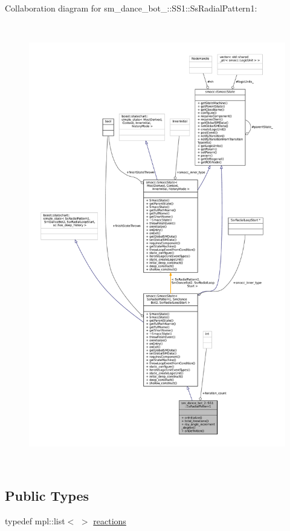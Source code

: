 Collaboration diagram for sm\+\_\+dance\+\_\+bot\+\_\+:\+:S\+S1\+:\+:Ss\+Radial\+Pattern1\+:
\nopagebreak
\begin{figure}[H]
\begin{center}
\leavevmode
\includegraphics[height=550pt]{structsm__dance__bot__2_1_1SS1_1_1SsRadialPattern1__coll__graph}
\end{center}
\end{figure}
\subsection*{Public Types}
\begin{DoxyCompactItemize}
\item 
typedef mpl\+::list$<$  $>$ \hyperlink{structsm__dance__bot__2_1_1SS1_1_1SsRadialPattern1_a110c4b5a691dd0192196bf82776aeb10}{reactions}
\end{DoxyCompactItemize}

